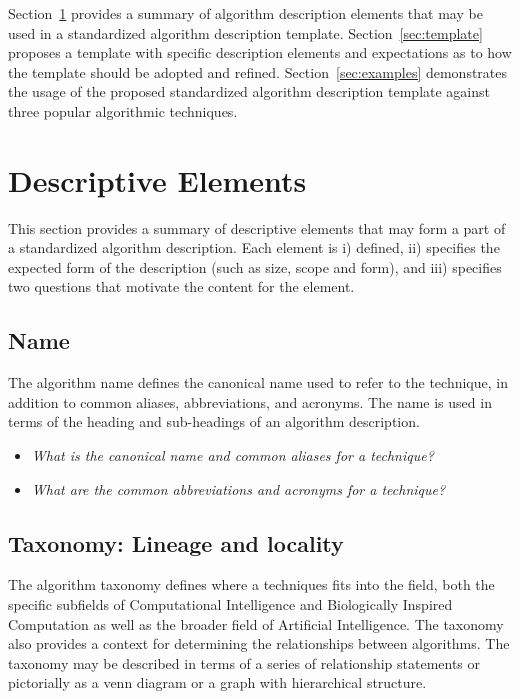\documentclass[a4paper, 11pt]{article}
\begin{document}
Section~\ref{sec:elements} provides a summary of algorithm description elements that may be used in a standardized algorithm description template. Section~\ref{sec:template} proposes a template with specific description elements and expectations as to how the template should be adopted and refined. Section~\ref{sec:examples} demonstrates the usage of the proposed standardized algorithm description template against three popular algorithmic techniques.

\section{Descriptive Elements}
\label{sec:elements}
This section provides a summary of descriptive elements that may form a part of a standardized algorithm description. Each element is i) defined, ii) specifies the expected form of the description (such as size, scope and form), and iii) specifies two questions that motivate the content for the element.

\subsection{Name}
The algorithm name defines the canonical name used to refer to the technique, in addition to common aliases, abbreviations, and acronyms. The name is used in terms of the heading and sub-headings of an algorithm description.

\begin{itemize}
	\item \emph{What is the canonical name and common aliases for a technique?}
	\item \emph{What are the common abbreviations and acronyms for a technique?}
\end{itemize}

\subsection{Taxonomy: Lineage and locality}
The algorithm taxonomy defines where a techniques fits into the field, both the specific subfields of Computational Intelligence and Biologically Inspired Computation as well as the broader field of Artificial Intelligence. The taxonomy also provides a context for determining the relationships between algorithms. The taxonomy may be described in terms of a series of relationship statements or pictorially as a venn diagram or a graph with hierarchical structure.
\end{document}
